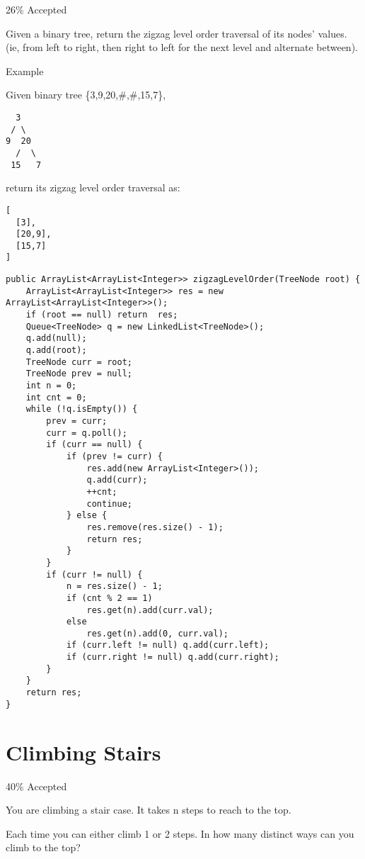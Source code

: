 \documentclass[12pt]{book}
\begin{document}
26\% Accepted

Given a binary tree, return the zigzag level order traversal of its nodes' values. (ie, from left to right, then right to left for the next level and alternate between).

Example

Given binary tree \{3,9,20,\#,\#,15,7\},
\lstset{language=java,label= ,caption= ,numbers=none}
\begin{lstlisting}
  3
 / \
9  20
  /  \
 15   7
\end{lstlisting}

return its zigzag level order traversal as:
\lstset{language=java,label= ,caption= ,numbers=none}
\begin{lstlisting}
[
  [3],
  [20,9],
  [15,7]
]
\end{lstlisting}
\lstset{language=java,label= ,caption= ,numbers=none}
\begin{lstlisting}
public ArrayList<ArrayList<Integer>> zigzagLevelOrder(TreeNode root) {
    ArrayList<ArrayList<Integer>> res = new ArrayList<ArrayList<Integer>>();
    if (root == null) return  res;
    Queue<TreeNode> q = new LinkedList<TreeNode>();
    q.add(null);
    q.add(root);
    TreeNode curr = root;
    TreeNode prev = null;
    int n = 0;
    int cnt = 0;
    while (!q.isEmpty()) {
        prev = curr;
        curr = q.poll();
        if (curr == null) {
            if (prev != curr) {
                res.add(new ArrayList<Integer>());
                q.add(curr);
                ++cnt;
                continue;
            } else {
                res.remove(res.size() - 1);
                return res;   
            }
        }
        if (curr != null) {
            n = res.size() - 1;
            if (cnt % 2 == 1)
                res.get(n).add(curr.val);
            else
                res.get(n).add(0, curr.val);
            if (curr.left != null) q.add(curr.left);
            if (curr.right != null) q.add(curr.right);
        }
    }
    return res;
}
\end{lstlisting}
\chapter{Climbing Stairs}
\label{sec-19}

40\% Accepted

You are climbing a stair case. It takes n steps to reach to the top.

Each time you can either climb 1 or 2 steps. In how many distinct ways can you climb to the top?
\end{document}
